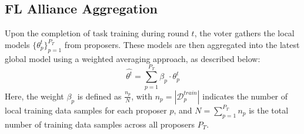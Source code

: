 \documentclass[conference]{IEEEtran}
\newcommand{\rui}[1]{{\color{black} #1}}
\newcommand{\FL}{\ac{FL} Alliance\xspace}
\begin{document}




\subsection{\FL Aggregation}

\rui{Upon the completion of task training during round $t$, the voter gathers the local models $\{\theta_p^{t}\}_{p=1}^{P_T}$ from proposers. These models are then aggregated into the latest global model using a weighted averaging approach, as described below:
\begin{equation*}
\hat{\theta^t} = \sum_{p=1}^{P_T} \beta_p \cdot \theta_p^{t}
\label{eq:WeightedAvg}
\end{equation*}
Here, the weight $\beta_p$ is defined as $\frac{n_p}{N}$, with $n_p = |\mathcal{D}_p^{train}|$ indicates the number of local training data samples for each proposer $p$, and $N = \sum_{p=1}^{P_T} n_p$ is the total number of training data samples across all proposers $P_T$. 
}



        
        
        
\end{document}
